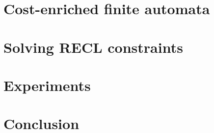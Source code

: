 \documentclass[runningheads]{llncs}
\begin{document}


\section{Cost-enriched finite automata} \label{sec:automaton}


\section{Solving RECL constraints} \label{sec:algorithm}


\section{Experiments} \label{sec:implementation}


\section{Conclusion} \label{sec:conclu}


\newpage




%
\end{document}
